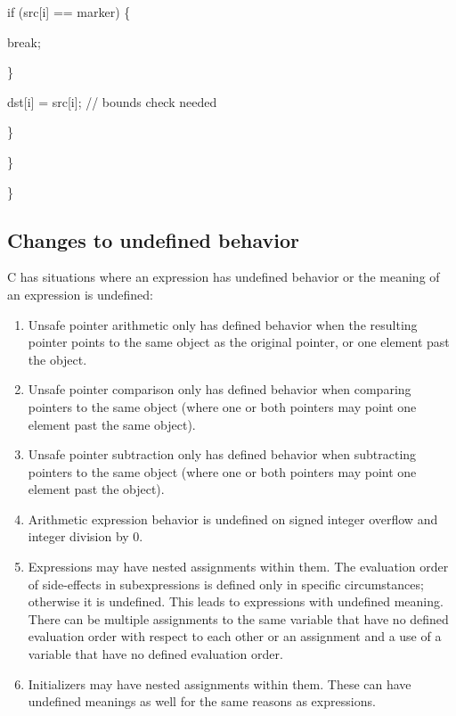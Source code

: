 \documentclass[]{article}
\begin{document}
if (src{[}i{]} == marker) \{

break;

\}

dst{[}i{]} = src{[}i{]}; // bounds check needed

\}

\}

\}

\subsection{\texorpdfstring{\protect\hypertarget{ux5fRef440365235}{}{\protect\hypertarget{ux5fToc440445424}{}{\protect\hypertarget{ux5fToc440449206}{}{\protect\hypertarget{ux5fToc440551856}{}{}}}}Changes
to undefined
behavior}{Changes to undefined behavior}}\label{changes-to-undefined-behavior}

C has situations where an expression has undefined behavior or the
meaning of an expression is undefined:

\begin{enumerate}
\def\labelenumi{\arabic{enumi}.}
\item
  Unsafe pointer arithmetic only has defined behavior when the resulting
  pointer points to the same object as the original pointer, or one
  element past the object.
\item
  Unsafe pointer comparison only has defined behavior when comparing
  pointers to the same object (where one or both pointers may point one
  element past the same object).
\item
  Unsafe pointer subtraction only has defined behavior when subtracting
  pointers to the same object (where one or both pointers may point one
  element past the object).
\item
  Arithmetic expression behavior is undefined on signed integer overflow
  and integer division by 0.
\item
  Expressions may have nested assignments within them. The evaluation
  order of side-effects in subexpressions is defined only in specific
  circumstances; otherwise it is undefined. This leads to expressions
  with undefined meaning. There can be multiple assignments to the same
  variable that have no defined evaluation order with respect to each
  other or an assignment and a use of a variable that have no defined
  evaluation order.
\item
  Initializers may have nested assignments within them. These can have
  undefined meanings as well for the same reasons as expressions.
\end{enumerate}
\end{document}
